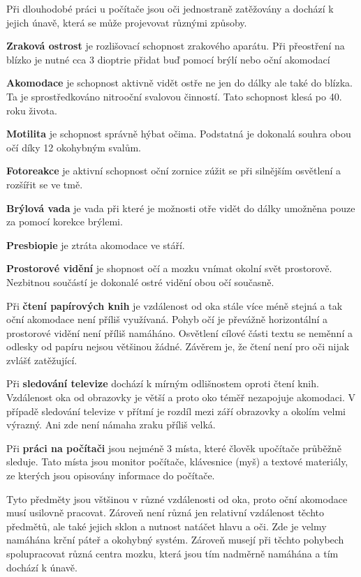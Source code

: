 
Při dlouhodobé práci u počítače jsou oči jednostraně zatěžovány a dochází k jejich únavě, která se může projevovat různými způsoby.

{\bf Zraková ostrost} je rozlišovací schopnost zrakového aparátu. Při přeostření na blízko je nutné cca 3 dioptrie přidat buď pomocí brýlí nebo oční akomodací

{\bf Akomodace} je schopnost aktivně vidět ostře ne jen do dálky ale také do blízka. Ta je sprostředkováno nitrooční svalovou činností. Tato schopnost klesá po 40. roku života.

{\bf Motilita} je schopnost správně hýbat očima. Podstatná je dokonalá souhra obou očí díky 12 okohybným svalům.

{\bf Fotoreakce} je aktivní schopnost oční zornice zúžit se při silnějším osvětlení a rozšířit se ve tmě.

{\bf Brýlová vada} je vada při které je možnosti otře vidět do dálky umožněna pouze za pomocí korekce brýlemi.

{\bf Presbiopie} je ztráta akomodace ve stáří.

{\bf Prostorové vidění} je shopnost očí a mozku vnímat okolní svět prostorově. Nezbitnou součástí je dokonalé ostré vidění obou očí současně.


Při {\bf čtení papírových knih} je vzdálenost od oka stále více méně stejná a tak oční akomodace není příliš využívaná. Pohyb očí je převážně horizontální a prostorové vidění není příliš namáháno. Osvětlení cílové části textu se neměnní a odlesky od papíru nejsou většinou žádné. Závěrem je, že čtení není pro oči nijak zvlášť zatěžující.

Při {\bf sledování televize} dochází k mírným odlišnostem oproti čtení knih. Vzdálenost oka od obrazovky je větší a proto oko téměř nezapojuje akomodaci. V případě sledování televize v přítmí je rozdíl mezi září obrazovky a okolím velmi výrazný. Ani zde není námaha zraku příliš velká.

Při {\bf práci na počítači} jsou nejméně 3 místa, které člověk upočítače průběžně sleduje. Tato místa jsou monitor počítače, klávesnice (myš) a textové materiály, ze kterých jsou opisovány informace do počítače. 

Tyto předměty jsou vštšinou v různé vzdálenosti od oka, proto oční akomodace musí usilovně pracovat. Zároveň není různá jen relativní vzdálenost těchto předmětů, ale také jejich sklon a nutnost natáčet hlavu a oči. Zde je velmy namáhána krční páteř a okohybný systém. Zároveň musejí při těchto pohybech spolupracovat různá centra mozku, která jsou tím nadměrně namáhána a tím dochází k únavě.

